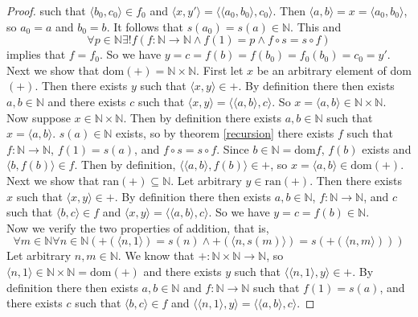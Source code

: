 \documentclass{report}
\begin{document}
\begin{proof}
such that $\langle b_0,c_0\rangle\in f_0$ and $\langle x,y'\rangle=\langle\langle a_0,b_0\rangle,c_0\rangle$. Then $\langle a,b\rangle=x=\langle a_0,b_0\rangle$, so $a_0=a$ and $b_0=b$.
It follows that $s(a_0)=s(a)\in\mathbb N$. This and 
\begin{equation*}
\forall p\in\mathbb N\exists!f(f:\mathbb N\to\mathbb N\land f(1)=p\land f\circ s=s\circ f)
\end{equation*}
implies that $f=f_0$. So we have $y=c=f(b)=f(b_0)=f_0(b_0)=c_0=y'$.\\
\indent Next we show that dom$(+)=\mathbb N\times\mathbb N$. First let $x$ be an arbitrary element of dom$(+)$. Then there exists $y$ such that $\langle x,y\rangle\in+$. By definition 
there then exists $a,b\in\mathbb N$ and there exists $c$ such that $\langle x,y\rangle=\langle\langle a,b\rangle,c\rangle$. So $x=\langle a,b\rangle\in\mathbb N\times\mathbb N$.\\
\indent Now suppose $x\in\mathbb N\times\mathbb N$. Then by definition there exists $a,b\in\mathbb N$ such that $x=\langle a,b\rangle$. $s(a)\in\mathbb N$ exists, so by theorem \ref{recursion} there
exists $f$ such that $f:\mathbb N\to\mathbb N$, $f(1)=s(a)$, and $f\circ s=s\circ f$.
Since $b\in\mathbb N=\text{dom}f$, $f(b)$ exists and $\langle b,f(b)\rangle\in f$.
Then by definition, $\langle\langle a,b\rangle,f(b)\rangle\in+$, so $x=\langle a,b\rangle\in\text{dom}(+)$.\\
\indent Next we show that ran$(+)\subseteq\mathbb N$. Let arbitrary $y\in\text{ran}(+)$. Then there exists $x$ such that $\langle x,y\rangle\in+$.
By definition there then exists $a,b\in\mathbb N$, $f:\mathbb N\to\mathbb N$, and $c$ such that
$\langle b,c\rangle\in f$ and $\langle x,y\rangle=\langle\langle a,b\rangle,c\rangle$.
So we have $y=c=f(b)\in\mathbb N$.\\
\indent Now we verify the two properties of addition, that is,
\begin{equation*}
\forall m\in\mathbb N\forall n\in\mathbb N(+(\langle n,1\rangle)=s(n)\land+(\langle n,s(m)\rangle)=s(+(\langle n,m\rangle)))
\end{equation*}
Let arbitrary $n,m\in\mathbb N$. We know that $+:\mathbb N\times\mathbb N\to\mathbb N$, so $\langle n,1\rangle\in\mathbb N\times\mathbb N=\text{dom}(+)$ and there exists $y$ such that
$\langle\langle n,1\rangle,y\rangle\in+$. By definition there then exists $a,b\in\mathbb N$ and $f:\mathbb N\to\mathbb N$ such that $f(1)=s(a)$, and there exists $c$ such that 
$\langle b,c\rangle\in f$ and $\langle\langle n,1\rangle,y\rangle=\langle\langle a,b\rangle,c\rangle$. 

\end{proof}
\end{document}
